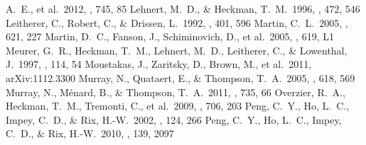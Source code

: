 \documentclass[apj]{emulateapj}
\begin{document}
\begin{thebibliography}{}
  A.~E., et al.\ 2012, \apj, 745, 85
 Lehnert, M.~D., \& Heckman,
  T.~M.\ 1996, \apj, 472, 546
 Leitherer, C., Robert, C., \&
  Drissen, L.\ 1992, \apj, 401, 596
 Martin, C.~L.\ 2005, \apj, 621, 227
 Martin, D.~C., Fanson, J.,
  Schiminovich, D., et al.\ 2005, \apjl, 619, L1
 Meurer, G.~R., Heckman, T.~M.,
  Lehnert, M.~D., Leitherer, C., \& Lowenthal, J.\ 1997, \aj, 114, 54
 Moustakas, J., Zaritsky, D.,
  Brown, M., et al.\ 2011, arXiv:1112.3300
 Murray, N., Quataert, E., \&
  Thompson, T.~A.\ 2005, \apj, 618, 569
 Murray, N., M{\'e}nard, B., \&
  Thompson, T.~A.\ 2011, \apj, 735, 66
 Overzier, R.~A., Heckman,
  T.~M., Tremonti, C., et al.\ 2009, \apj, 706, 203
 Peng, C.~Y., Ho, L.~C., Impey,
  C.~D., \& Rix, H.-W.\ 2002, \aj, 124, 266
 Peng, C.~Y., Ho, L.~C., Impey,
  C.~D., \& Rix, H.-W.\ 2010, \aj, 139, 2097

\end{thebibliography}
\end{document}
